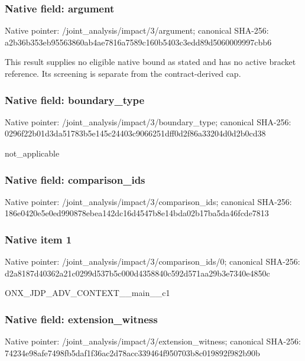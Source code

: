 \documentclass[10pt,a4paper]{article}
\begin{document}
\subsubsection{Native field: argument}
Native pointer: /joint\_\allowbreak{}analysis/impact/3/argument; canonical SHA-256: a2b36b353eb95563860ab4ae7816a7589c160b5403c3edd89d5060009997cbb6

\begingroup\raggedright\sloppy This result supplies no eligible native bound as stated and has no active bracket reference. Its screening is separate from the contract-derived cap.\par\endgroup

\subsubsection{Native field: boundary\_\allowbreak{}type}
Native pointer: /joint\_\allowbreak{}analysis/impact/3/boundary\_\allowbreak{}type; canonical SHA-256: 0296f22b01d3da51783b5e145c24403c9066251dff0d2f86a33204d0d2b0cd38

\begingroup\raggedright\sloppy not\_\allowbreak{}applicable\par\endgroup

\subsubsection{Native field: comparison\_\allowbreak{}ids}
Native pointer: /joint\_\allowbreak{}analysis/impact/3/comparison\_\allowbreak{}ids; canonical SHA-256: 186e0420e5e0ed990878ebea142dc16d4547b8e14bda02b17ba5da46fcde7813

\subsubsection{Native item 1}
Native pointer: /joint\_\allowbreak{}analysis/impact/3/comparison\_\allowbreak{}ids/0; canonical SHA-256: d2a8187d40362a21c0299d537b5c000d4358840c592d571aa29b3e7340e4850c

\begingroup\raggedright\sloppy ONX\_\allowbreak{}JDP\_\allowbreak{}ADV\_\allowbreak{}CONTEXT\_\allowbreak{}\_\allowbreak{}main\_\allowbreak{}\_\allowbreak{}c1\par\endgroup

\subsubsection{Native field: extension\_\allowbreak{}witness}
Native pointer: /joint\_\allowbreak{}analysis/impact/3/extension\_\allowbreak{}witness; canonical SHA-256: 74234e98afe7498fb5daf1f36ac2d78acc339464f950703b8c019892f982b90b
\end{document}
